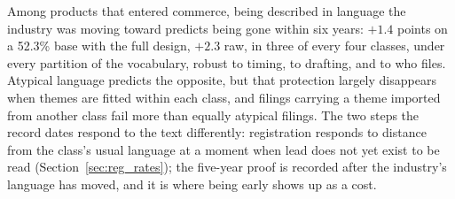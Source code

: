 Among products that entered commerce, being described in language the
industry was moving toward predicts being gone within six years: $+1.4$
points on a 52.3\% base with the full design, $+2.3$ raw, in three of
every four classes, under every partition of the vocabulary, robust to
timing, to drafting, and to who files. Atypical language predicts the
opposite, but that protection largely disappears when themes are fitted
within each class, and filings carrying a theme imported from another
class fail more than equally atypical filings. The two steps the record
dates respond to the text differently: registration responds to distance
from the class's usual language at a moment when lead does not yet exist
to be read (Section~\ref{sec:reg_rates}); the five-year proof is recorded
after the industry's language has moved, and it is where being early
shows up as a cost.
